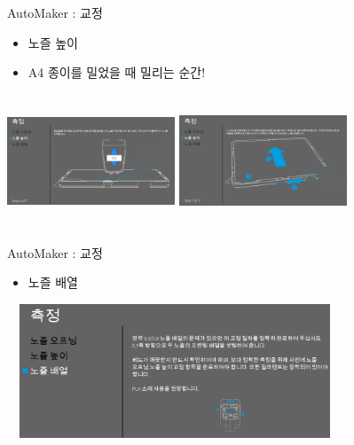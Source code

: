 \documentclass[11pt]{beamer}
\begin{document}
\begin{frame}[t]{AutoMaker : 교정 }\footnotesize
\begin{itemize}
\item 노즐 높이
\item A4 종이를 밀었을 때 밀리는 순간!
\end{itemize}
\includegraphics[width=5cm, height=4cm]{./image/17_50.png} \@ \includegraphics[width=5cm, height=4cm]{./image/17_51.png}
\end{frame}



\begin{frame}[t]{AutoMaker : 교정 }\footnotesize
\begin{itemize}
\item 노즐 배열
\end{itemize}
\includegraphics[width=10cm, height=4cm]{./image/17_32.png}
\end{frame}
\end{document}
